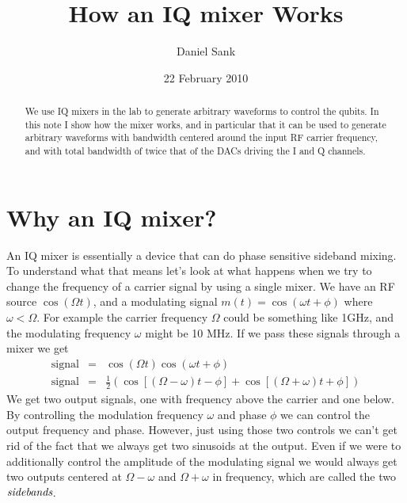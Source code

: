 \documentclass{article}
\title{How an IQ mixer Works}
\date{22 February 2010}
\author{Daniel Sank}
\begin{document}
\maketitle

\begin{abstract}
We use IQ mixers in the lab to generate arbitrary waveforms to control
the qubits. In this note I show how the mixer works, and in particular
that it can be used to generate arbitrary waveforms with bandwidth
centered around the input RF carrier frequency, and with total bandwidth
of twice that of the DACs driving the I and Q channels. 
\end{abstract}

\section{Why an IQ mixer?}

An IQ mixer is essentially a device that can do phase sensitive sideband
mixing. To understand what that means let's look at what happens when
we try to change the frequency of a carrier signal by using a single
mixer. We have an RF source $\cos(\Omega t)$, and a modulating signal
$m(t)=\cos(\omega t+\phi)$ where $\omega<\Omega$. For example the
carrier frequency $\Omega$ could be something like 1GHz, and the
modulating frequency $\omega$ might be 10 MHz. If we pass these signals
through a mixer we get\begin{eqnarray*}
\textrm{signal} & = & \cos(\Omega t)\cos(\omega t+\phi)\\
\textrm{signal} & = & \frac{1}{2}\left(\cos\left[\left(\Omega-\omega\right)t-\phi\right]+\cos\left[\left(\Omega+\omega\right)t+\phi\right]\right)\end{eqnarray*}
 We get two output signals, one with frequency above the carrier and
one below. By controlling the modulation frequency $\omega$ and phase
$\phi$ we can control the output frequency and phase. However, just
using those two controls we can't get rid of the fact that we always
get two sinusoids at the output. Even if we were to additionally control
the amplitude of the modulating signal we would always get two outputs
centered at $\Omega-\omega$ and $\Omega+\omega$ in frequency, which
are called the two $\emph{sidebands}$.
\end{document}
